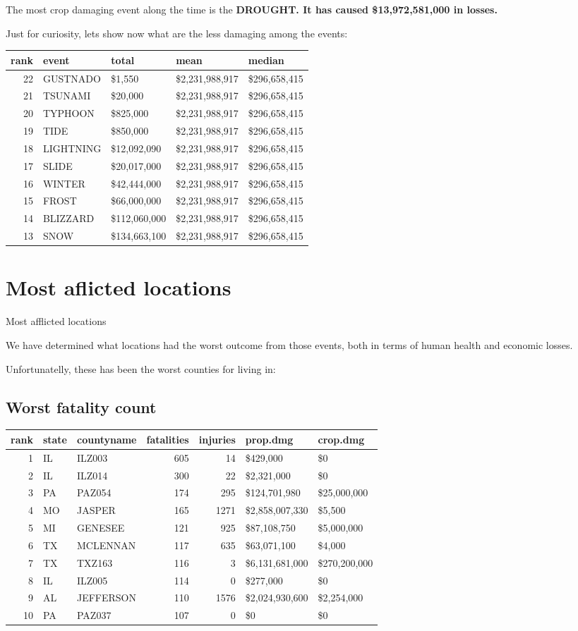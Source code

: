 \documentclass[]{article}
\begin{document}
The most crop damaging event along the time is the \textbf{DROUGHT. It
has caused \$13,972,581,000 in losses.}

Just for curiosity, lets show now what are the less damaging among the
events:

\begin{longtable}[]{@{}rllll@{}}
\toprule
rank & event & total & mean & median\tabularnewline
\midrule
\endhead
22 & GUSTNADO & \$1,550 & \$2,231,988,917 & \$296,658,415\tabularnewline
21 & TSUNAMI & \$20,000 & \$2,231,988,917 & \$296,658,415\tabularnewline
20 & TYPHOON & \$825,000 & \$2,231,988,917 &
\$296,658,415\tabularnewline
19 & TIDE & \$850,000 & \$2,231,988,917 & \$296,658,415\tabularnewline
18 & LIGHTNING & \$12,092,090 & \$2,231,988,917 &
\$296,658,415\tabularnewline
17 & SLIDE & \$20,017,000 & \$2,231,988,917 &
\$296,658,415\tabularnewline
16 & WINTER & \$42,444,000 & \$2,231,988,917 &
\$296,658,415\tabularnewline
15 & FROST & \$66,000,000 & \$2,231,988,917 &
\$296,658,415\tabularnewline
14 & BLIZZARD & \$112,060,000 & \$2,231,988,917 &
\$296,658,415\tabularnewline
13 & SNOW & \$134,663,100 & \$2,231,988,917 &
\$296,658,415\tabularnewline
\bottomrule
\end{longtable}

\section{Most aflicted locations}\label{most-aflicted-locations}

Most afflicted locations

We have determined what locations had the worst outcome from those
events, both in terms of human health and economic losses.

Unfortunatelly, these has been the worst counties for living in:

\subsection{Worst fatality count}\label{worst-fatality-count}

\begin{longtable}[]{@{}rllrrll@{}}
\toprule
rank & state & countyname & fatalities & injuries & prop.dmg &
crop.dmg\tabularnewline
\midrule
\endhead
1 & IL & ILZ003 & 605 & 14 & \$429,000 & \$0\tabularnewline
2 & IL & ILZ014 & 300 & 22 & \$2,321,000 & \$0\tabularnewline
3 & PA & PAZ054 & 174 & 295 & \$124,701,980 &
\$25,000,000\tabularnewline
4 & MO & JASPER & 165 & 1271 & \$2,858,007,330 & \$5,500\tabularnewline
5 & MI & GENESEE & 121 & 925 & \$87,108,750 & \$5,000,000\tabularnewline
6 & TX & MCLENNAN & 117 & 635 & \$63,071,100 & \$4,000\tabularnewline
7 & TX & TXZ163 & 116 & 3 & \$6,131,681,000 &
\$270,200,000\tabularnewline
8 & IL & ILZ005 & 114 & 0 & \$277,000 & \$0\tabularnewline
9 & AL & JEFFERSON & 110 & 1576 & \$2,024,930,600 &
\$2,254,000\tabularnewline
10 & PA & PAZ037 & 107 & 0 & \$0 & \$0\tabularnewline
\bottomrule
\end{longtable}
\end{document}
